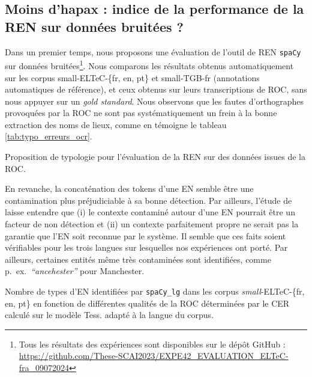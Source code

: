 \subsection{Moins d'hapax : indice de la performance de la REN sur données bruitées ?}
\label{subsec:eval_manu_OCR-IMPACT-NER}
Dans un premier temps, nous proposons une évaluation de l'outil de REN \texttt{spaCy} sur données bruitées\footnote{Tous les résultats des expériences sont disponibles sur le dépôt GitHub : \url{https://github.com/These-SCAI2023/EXPE42_EVALUATION_ELTeC-fra_09072024}}. Nous comparons les résultats obtenus automatiquement sur les corpus small-ELTeC-\{fr, en, pt\} et small-TGB-fr (annotations automatiques de référence), et ceux obtenus sur leurs transcriptions de ROC, sans nous appuyer sur un \textit{gold standard}. Nous observons que les fautes d'orthographes provoquées par la ROC ne sont pas systématiquement un frein à la bonne extraction des noms de lieux, comme en témoigne le tableau \ref{tab:typo_erreurs_ocr}.
\begin{table}[h!]
\small
    \centering
   
    \caption{Proposition de typologie pour l'évaluation de la REN sur des données issues de la ROC.}
    \label{tab:typo_erreurs_ocr}
\end{table}

En revanche, la concaténation des tokens d'une EN semble être une contamination plus préjudiciable à sa bonne détection. Par ailleurs, l'étude de  laisse entendre que (i) le contexte contaminé autour d'une EN pourrait être un facteur de non détection et (ii) un contexte parfaitement propre ne serait pas la garantie que l'EN soit reconnue par le système. Il semble que ces faits soient vérifiables pour les trois langues sur lesquelles nos expériences ont porté. Par ailleurs, certaines entités même très contaminées sont identifiées, comme p.\ ex.\  \textit{``ancehester''} pour \og{}Manchester\fg{}. 


\begin{table}[h!]
    \centering
    \small
    
    \caption{Nombre de types d'EN identifiées par \texttt{spaCy\_lg} dans les corpus \textit{small}-ELTeC-\{fr, en, pt\}  en fonction de différentes qualités de la ROC déterminées par le CER calculé sur le modèle Tess. adapté à la langue du corpus. 
    }
    \label{tab:ELTeC_bon_mauvais}
\end{table}

